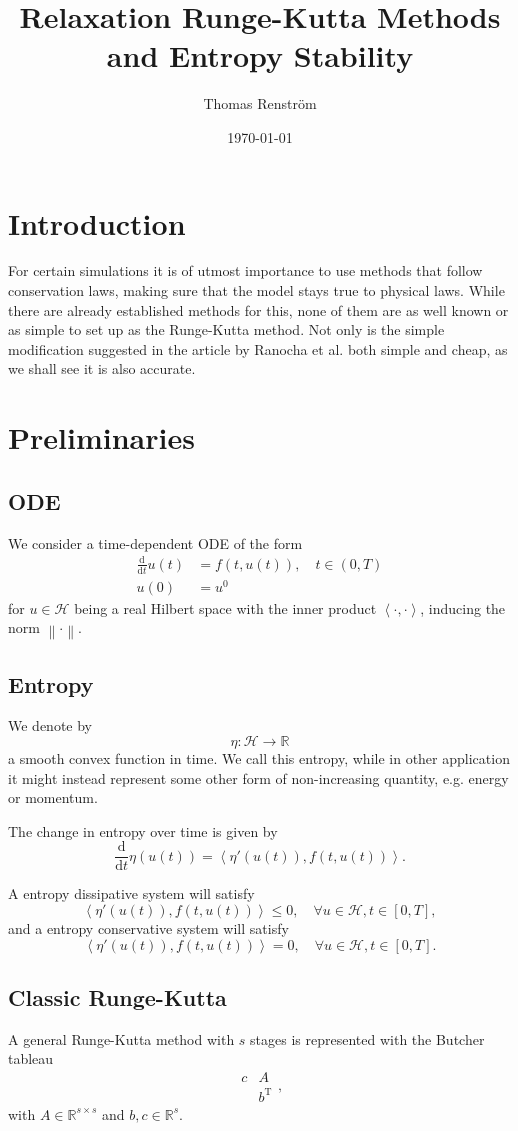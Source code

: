 \documentclass{report}
\title{Relaxation Runge-Kutta Methods and Entropy Stability}
\author{Thomas Renström}
\date{\today}
\newcommand{\norm}[1]{\left\lVert#1\right\rVert}
\newcommand{\inner}[2]{\left< #1 , #2 \right>}
\newcommand{\T}{\mathrm{T}}
\begin{document}
\chapter{Introduction}

For certain simulations it is of utmost importance to use methods that follow conservation laws, making sure that the model stays true to physical laws. While there are already established methods for this, none of them are as well known or as simple to set up as the Runge-Kutta method. Not only is the simple modification suggested in the article by Ranocha et al. \cite{Ranocha_2020} both simple and cheap, as we shall see it is also accurate.

\chapter{Preliminaries}
\section{ODE}
    We consider a time-dependent ODE of the form
    \begin{align*}
        \frac{\text{d}}{\text{d}t} u(t) &= f(t, u(t)), \quad t \in (0, T)\\
        u(0) &= u^0
    \end{align*}
    for \(u \in \mathcal{H}\) being a real Hilbert space with the inner product \(\inner{\cdot}{\cdot}\), inducing the norm \(\norm{\cdot}\).


\section{Entropy}
    We denote by
    \[ \eta: \mathcal{H} \rightarrow \mathbb{R}\]
    a smooth convex function in time.
    We call this entropy, while in other application it might instead represent some other form of non-increasing quantity, e.g. energy or momentum.

    The change in entropy over time is given by
    \[\frac{\text{d}}{\text{d}t} \eta (u(t)) = \inner{\eta'(u(t))}{f(t, u(t))}.\]

    \vspace*{5mm}
    A entropy dissipative system will satisfy
    \[\inner{\eta'(u(t))}{f(t, u(t))} \leq 0, \quad \forall u \in \mathcal{H}, t \in [0, T],\]
    and a entropy conservative system will satisfy
    \[\inner{\eta'(u(t))}{f(t, u(t))} = 0, \quad \forall u \in \mathcal{H}, t \in [0, T].\]


\section{Classic Runge-Kutta}
    A general Runge-Kutta method with \(s\) stages is represented with the Butcher tableau
    \[\begin{array}{c|c}
        c & A\\
        \hline
        ~ & b^{\T}
    \end{array},\]
    with \(A \in \mathbb{R}^{s \times s}\) and \(b, c \in \mathbb{R}^s.\)
\end{document}
